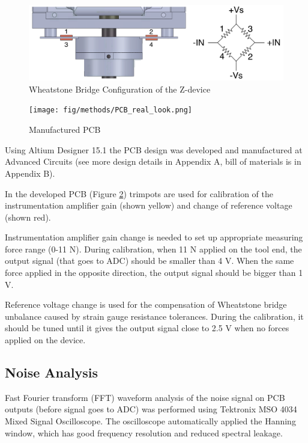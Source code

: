 \begin{figure}[h]
	\begin{center}
		\includegraphics[width=140mm]{fig/methods/Wiring_z.pdf}
	\end{center}
	\vspace{-4mm}
	\caption[Wheatstone Bridge Configuration of the Z-device]
	{Wheatstone Bridge Configuration of the Z-device}
	\label{fig:WB_z}
	\vspace{-2mm}
\end{figure}
	
\begin{figure}[h]
	\begin{center}
		\texttt{[image: fig/methods/PCB\_real\_look.png]}
	\end{center}
	\vspace{-4mm}
	\caption[Manufactured PCB]
	{Manufactured PCB}
	\label{fig:PCB_real}
	\vspace{-2mm}
\end{figure}
	
Using Altium Designer 15.1 the PCB design was developed and manufactured at Advanced Circuits \cite{PCB_manufacturer} (see more design details in Appendix A, bill of materials is in Appendix B). 

In the developed PCB (Figure \ref{fig:PCB_real}) trimpots are used for calibration of the instrumentation amplifier gain (shown yellow) and change of reference voltage (shown red).

Instrumentation amplifier gain change is needed to set up appropriate measuring force range (0-11 N). During calibration, when 11 N applied on the tool end, the output signal (that goes to ADC) should be smaller than 4 V. When the same force applied in the opposite direction, the output signal should be bigger than 1 V.
 
Reference voltage change is used for the compensation of Wheatstone bridge unbalance caused by strain gauge resistance tolerances. During the calibration, it should be tuned until it gives the output signal close to 2.5 V when no forces applied on the device.


	\subsection{Noise Analysis}
	\label{sec:NoiseExp}
	Fast Fourier transform (FFT) waveform analysis of the noise signal on PCB outputs (before signal goes to ADC) was performed using Tektronix MSO 4034 Mixed Signal Oscilloscope. The oscilloscope automatically applied the Hanning window, which has good frequency resolution and reduced spectral leakage\cite{harris_use_1978}.
	
